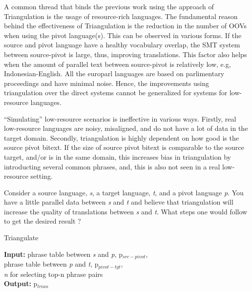  A common thread that binds the previous work using the approach of Triangulation is the usage of resource-rich languages. The fundamental reason behind the effectiveness of Triangulation is the reduction in the number of OOVs when using the pivot language(s). This can be observed in various forms. If the source and pivot language have a healthy vocabulary overlap, the SMT system between source-pivot is large, thus, improving translations. This factor also helps when the amount of parallel text between source-pivot is relatively low, e.g, Indonesian-English.  All the europarl languages are based on parlimentary proceedings and have minimal noise. Hence, the improvements using triangulation over the direct systems cannot be generalized for systems for low-resource languages.

 ``Simulating'' low-resource scenarios is ineffective in various ways. Firstly, real low-resource languages are noisy, misaligned, and do not have a lot of data in the target domain. Secondly, triangulation is highly dependent on how good is the source pivot bitext. If the size of source pivot bitext is comparable to the source target, and/or is in the same domain, this increases bias in triangulation by introducting several common phrases, and, this is also not seen in a real low-resource setting.


 Consider a source language, \emph{s}, a target language, \emph{t}, and a pivot language \emph{p}. You have a little parallel data between \emph{s} and \emph{t} and believe that triangulation will increase the quality of translations between \emph{s} and \emph{t}. What steps one would follow to get the desired result ?

\begin{algorithm}
\caption{Triangulate}
\textbf{Input:} phrase table between \emph{s} and \emph{p}, p$_{src-pivot}$, \\
 phrase table between \emph{p} and \emph{t}, p$_{pivot-tgt}$,  \\
 \emph{n} for selecting top-n phrase pairs \\
\textbf{Output:} p$_{trian}$
\begin{algorithmic}
 

        \ENDFOR
        \ENDIF
        \ENDFOR


\end{algorithmic}

\end{algorithm}

